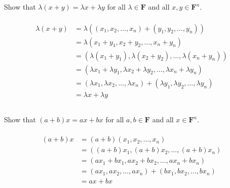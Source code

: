 \documentclass[a4paper]{article}
\begin{document}
\subsection{}
Show that $\lambda(x+y)=\lambda x+\lambda y$   for all  $\lambda \in \mathbf{F}$  and all  $x, y \in \mathbf{F}^{n}$.
\paragraph{}
\[
    \begin{aligned}
        \lambda(x+y) & =\lambda((x_1,x_2,\ldots,x_n)+(y_1,y_2,\ldots,y_n))                                        \\
                     & =\lambda(x_1+y_1,x_2+y_2,\ldots,x_n+y_n)                                                   \\
                     & =(\lambda(x_1+y_1),\lambda(x_2+y_2),\ldots,\lambda(x_n+y_n))                               \\
                     & =(\lambda x_1+\lambda y_1,\lambda x_2+\lambda y_2,\ldots,\lambda x_n+\lambda y_n)          \\
                     & =(\lambda x_1,\lambda x_2,\ldots,\lambda x_n)+(\lambda y_1,\lambda y_2,\ldots,\lambda y_n) \\
                     & =\lambda x+\lambda y
    \end{aligned}
\]

\subsection{}
Show that $(a+b) x=a x+b x$ for all $a, b \in \mathbf{F}$ and all $x \in \mathbf{F}^{n}$.
\paragraph{}
\[
    \begin{aligned}
        (a+b) x & =(a+b)(x_1,x_2,\ldots,x_n)                       \\
                & =((a+b)x_1,(a+b)x_2,\ldots,(a+b)x_n)             \\
                & =(ax_1+bx_1,ax_2+bx_2,\ldots,ax_n+bx_n)          \\
                & =(ax_1,ax_2,\ldots,ax_n)+(bx_1,bx_2,\ldots,bx_n) \\
                & =ax+bx
    \end{aligned}
\]
\section{}
\end{document}

